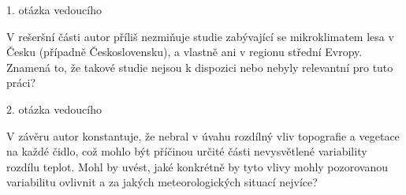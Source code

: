 \documentclass[
	11pt, %
]{beamer}
\begin{document}
\begin{frame}[plain] %
1. otázka vedoucího

V rešeršní části autor příliš nezmiňuje studie zabývající se mikroklimatem lesa v Česku (případně Československu), a vlastně ani v regionu střední Evropy. Znamená to, že takové studie nejsou k dispozici nebo nebyly relevantní pro tuto práci?

\end{frame}

\begin{frame}[plain] %
2. otázka vedoucího

V závěru autor konstantuje, že nebral v úvahu rozdílný vliv topografie a vegetace na každé čidlo, což mohlo být příčinou určité části nevysvětlené variability rozdílu teplot. Mohl by uvést, jaké konkrétně by tyto vlivy mohly pozorovanou variabilitu ovlivnit a za jakých meteorologických situací nejvíce?



\end{frame}
\end{document}

